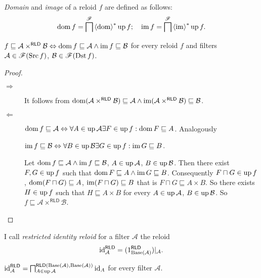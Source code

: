 \begin{defn}
\emph{Domain} and \emph{image}
of a reloid $f$ are defined as follows:
\[
\operatorname{dom} f=\bigsqcap^{\mathscr{F}}\left\langle \operatorname{dom}\right\rangle ^{\ast}\operatorname{up} f;\quad\operatorname{im} f=\bigsqcap^{\mathscr{F}}\left\langle \operatorname{im}\right\rangle ^{\ast}\operatorname{up} f.
\]
\end{defn}
\begin{prop}
$f\sqsubseteq\mathcal{A}\times^{\mathsf{RLD}}\mathcal{B}\Leftrightarrow\operatorname{dom} f\sqsubseteq\mathcal{A}\land\operatorname{im} f\sqsubseteq\mathcal{B}$
for every reloid $f$ and filters $\mathcal{A}\in\mathscr{F}(\operatorname{Src} f)$,
$\mathcal{B}\in\mathscr{F}(\operatorname{Dst} f)$.\end{prop}
\begin{proof}
~
\begin{description}
\item [{$\Rightarrow$}] It follows from $\operatorname{dom}(\mathcal{A}\times^{\mathsf{RLD}}\mathcal{B})\sqsubseteq\mathcal{A}\land\operatorname{im}(\mathcal{A}\times^{\mathsf{RLD}}\mathcal{B})\sqsubseteq\mathcal{B}$.
\item [{$\Leftarrow$}] $\operatorname{dom} f\sqsubseteq\mathcal{A}\Leftrightarrow\forall A\in\operatorname{up}\mathcal{A}\exists F\in\operatorname{up} f:\operatorname{dom} F\sqsubseteq A$.
Analogously


$\operatorname{im} f\sqsubseteq\mathcal{B}\Leftrightarrow\forall B\in\operatorname{up}\mathcal{B}\exists G\in\operatorname{up} f:\operatorname{im} G\sqsubseteq B$.


Let $\operatorname{dom} f\sqsubseteq\mathcal{A}\land\operatorname{im} f\sqsubseteq\mathcal{B}$,
$A\in\operatorname{up}\mathcal{A}$, $B\in\operatorname{up}\mathcal{B}$. Then there exist $F,G\in\operatorname{up} f$
such that $\operatorname{dom} F\sqsubseteq A\land\operatorname{im} G\sqsubseteq B$. Consequently
$F\sqcap G\in\operatorname{up} f$, $\operatorname{dom}(F\sqcap G)\sqsubseteq A$, $\operatorname{im}(F\sqcap G)\sqsubseteq B$
that is $F\sqcap G\sqsubseteq A\times B$. So there exists $H\in\operatorname{up} f$
such that $H\sqsubseteq A\times B$ for every $A\in\operatorname{up}\mathcal{A}$,
$B\in\operatorname{up}\mathcal{B}$. So $f\sqsubseteq\mathcal{A}\times^{\mathsf{RLD}}\mathcal{B}$.

\end{description}
\end{proof}
\begin{defn}
I call \emph{restricted identity
reloid} for a filter $\mathcal{A}$ the reloid
\[
\operatorname{id}_{\mathcal{A}}^{\mathsf{RLD}}=(1_{\operatorname{Base}(\mathcal{A})}^{\mathsf{RLD}})|_{\mathcal{A}}.
\]
\end{defn}
\begin{thm}
$\operatorname{id}_{\mathcal{A}}^{\mathsf{RLD}}=\bigsqcap_{A\in\operatorname{up}\mathcal{A}}^{\mathsf{RLD}(\operatorname{Base}(\mathcal{A}),\operatorname{Base}(\mathcal{A}))}\operatorname{id}_{A}$
for every filter $\mathcal{A}$.\end{thm}
